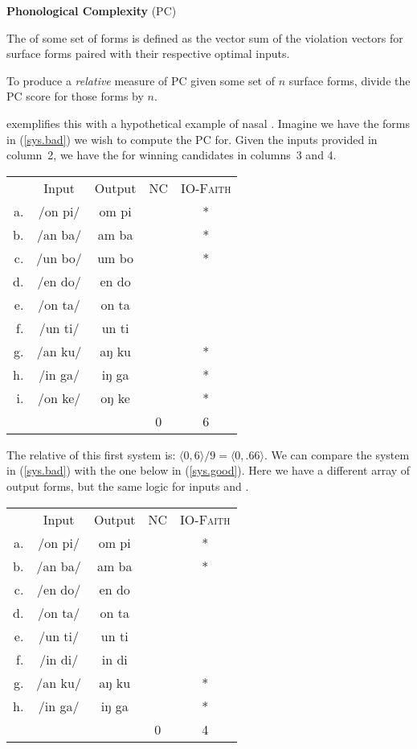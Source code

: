 \documentclass[output=paper,
modfonts
]{LSP/langsci}
\begin{document}
\ea
\label{pc}
\textbf{Phonological Complexity} (PC)

The  of some set of forms is defined as the vector sum of the  violation vectors for surface forms paired with their respective  optimal inputs.

\vspace{.1in}

To produce a \emph{relative} measure of PC given some set of $n$ surface forms, divide the PC score for those forms by $n$.
\z

\citet{inopt.phon} exemplifies this with a hypothetical example of nasal . Imagine we have the forms in (\ref{sys.bad}) we wish to compute the PC for. Given the inputs provided in column~2, we have the  for winning candidates in columns~3 and 4. 

\ea
\label{sys.bad}
\begin{tabular}[t]{rc|c|c|c}
   & Input   & Output & NC & \textsc{IO-Faith} \\
\cline{2-5}
a. & /on pi/ & om pi  &    & * \\
b. & /an ba/ & am ba  &    & * \\
c. & /un bo/ & um bo  &    & * \\
d. & /en do/ & en do  &    & \\
e. & /on ta/ & on ta  &    & \\
f. & /un ti/ & un ti  &    & \\
g. & /an ku/ & aŋ ku  &    & * \\
h. & /in ga/ & iŋ ga  &    & * \\
i. & /on ke/ & oŋ ke  &    & * \\
\cline{2-5}
   &         &        & 0  & 6
\end{tabular}
\z

\noindent The relative  of this first system is: $\langle0,6\rangle/9 = \langle0,.66\rangle$. We can compare the system in (\ref{sys.bad}) with the one below in (\ref{sys.good}). Here we have a different array of output forms, but the same logic for inputs and .

\ea
\label{sys.good}
\begin{tabular}[t]{rc|c|c|c}
   & Input   & Output & NC & \textsc{IO-Faith} \\
\cline{2-5}
a. & /on pi/ & om pi  &    & * \\
b. & /an ba/ & am ba  &    & * \\
c. & /en do/ & en do  &    & \\
d. & /on ta/ & on ta  &    & \\
e. & /un ti/ & un ti  &    & \\
f. & /in di/ & in di  &    & \\
g. & /an ku/ & aŋ ku  &    & * \\
h. & /in ga/ & iŋ ga  &    & * \\
\cline{2-5}
   &         &        & 0  & 4
\end{tabular}
\z
\end{document}
